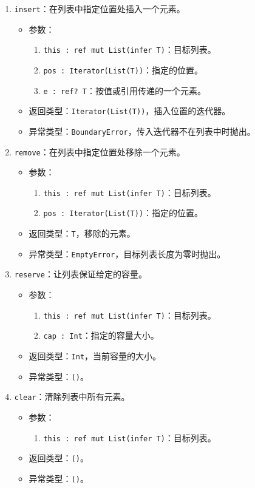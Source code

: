 \begin{enumerate}
	\item \lstinline!insert!：在列表中指定位置处插入一个元素。
	\begin{itemize}
		\item 参数：
		\begin{enumerate}
			\item \lstinline!this : ref mut List(infer T)!：目标列表。
			\item \lstinline!pos : Iterator(List(T))!：指定的位置。
			\item \lstinline!e : ref? T!：按值或引用传递的一个元素。
		\end{enumerate}
		\item 返回类型：\lstinline!Iterator(List(T))!，插入位置的迭代器。
		\item 异常类型：\lstinline!BoundaryError!，传入迭代器不在列表中时抛出。
	\end{itemize}
	
	\item \lstinline!remove!：在列表中指定位置处移除一个元素。
	\begin{itemize}
		\item 参数：
		\begin{enumerate}
			\item \lstinline!this : ref mut List(infer T)!：目标列表。
			\item \lstinline!pos : Iterator(List(T))!：指定的位置。
		\end{enumerate}
		\item 返回类型：\lstinline!T!，移除的元素。
		\item 异常类型：\lstinline!EmptyError!，目标列表长度为零时抛出。
	\end{itemize}
	
	\item \lstinline!reserve!：让列表保证给定的容量。
	\begin{itemize}
		\item 参数：
		\begin{enumerate}
			\item \lstinline!this : ref mut List(infer T)!：目标列表。
			\item \lstinline!cap : Int!：指定的容量大小。
		\end{enumerate}
		\item 返回类型：\lstinline!Int!，当前容量的大小。
		\item 异常类型：\lstinline!()!。
	\end{itemize}
	
	\item \lstinline!clear!：清除列表中所有元素。
	\begin{itemize}
		\item 参数：
		\begin{enumerate}
			\item \lstinline!this : ref mut List(infer T)!：目标列表。
		\end{enumerate}
		\item 返回类型：\lstinline!()!。
		\item 异常类型：\lstinline!()!。
	\end{itemize}
	

\end{enumerate}
